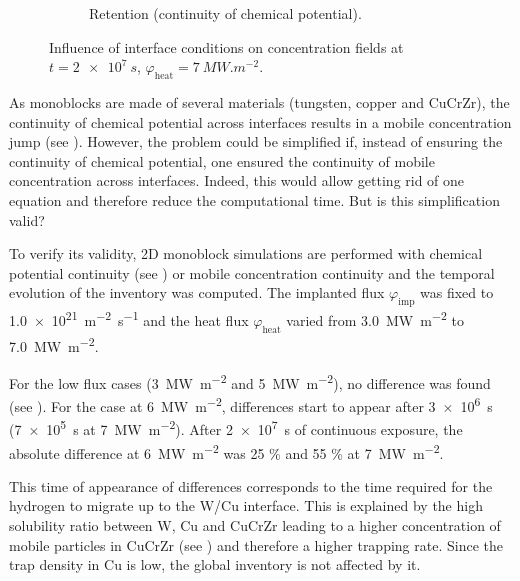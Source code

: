 \begin{figure}
\begin{subfigure}{0.5\linewidth}
        \caption{Retention (continuity of chemical potential).}
    \end{subfigure}
    \caption{Influence of interface conditions on concentration fields at $t=\SI{2e7}{s}$, $\varphi_\mathrm{heat} = \SI{7}{MW.m^{-2}}$.}
\end{figure}

As monoblocks are made of several materials (tungsten, copper and CuCrZr), the continuity of chemical potential across interfaces results in a mobile concentration jump (see ).
However, the problem could be simplified if, instead of ensuring the continuity of chemical potential, one ensured the continuity of mobile concentration across interfaces.
Indeed, this would allow getting rid of one equation and therefore reduce the computational time.
But is this simplification valid?

To verify its validity, 2D monoblock simulations are performed with chemical potential continuity (see ) or mobile concentration continuity and the temporal evolution of the inventory was computed.
The implanted flux $\varphi_\mathrm{imp}$ was fixed to \SI{1.0e21}{m^{-2}.s^{-1}} and the heat flux $\varphi_\mathrm{heat}$ varied from \SI{3.0}{MW.m^{-2}} to \SI{7.0}{MW.m^{-2}}.

For the low flux cases (\SI{3}{MW.m^{-2}} and \SI{5}{MW.m^{-2}}), no difference was found (see ).
For the case at \SI{6}{MW.m^{-2}}, differences start to appear after \SI{3e6}{s} (\SI{7e5}{s} at \SI{7}{MW.m^{-2}}).
After \SI{2e7}{s} of continuous exposure, the absolute difference at \SI{6}{MW.m^{-2}} was 25 \% and 55 \% at \SI{7}{MW.m^{-2}}.

This time of appearance of differences corresponds to the time required for the hydrogen to migrate up to the W/Cu interface.
This is explained by the high solubility ratio between W, Cu and CuCrZr leading to a higher concentration of mobile particles in CuCrZr (see ) and therefore a higher trapping rate.
Since the trap density in Cu is low, the global inventory is not affected by it.


